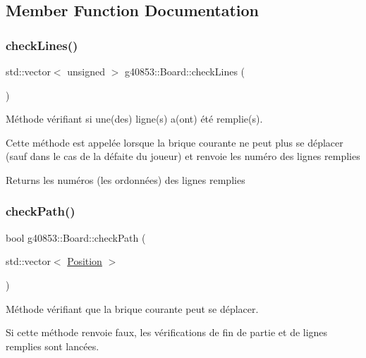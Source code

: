 \subsection{Member Function Documentation}
\hypertarget{classg40853_1_1_board_ae488e255dcf0fc9596870c60bf09a680}{}\label{classg40853_1_1_board_ae488e255dcf0fc9596870c60bf09a680} 
\subsubsection{\texorpdfstring{check\+Lines()}{checkLines()}}
{\footnotesize\ttfamily std\+::vector$<$ unsigned $>$ g40853\+::\+Board\+::check\+Lines (\begin{DoxyParamCaption}{ }\end{DoxyParamCaption})}



Méthode vérifiant si une(des) ligne(s) a(ont) été remplie(s). 

Cette méthode est appelée lorsque la brique courante ne peut plus se déplacer (sauf dans le cas de la défaite du joueur) et renvoie les numéro des lignes remplies

\begin{DoxyReturn}{Returns}
les numéros (les ordonnées) des lignes remplies 
\end{DoxyReturn}
\hypertarget{classg40853_1_1_board_a35e8081321fe2e5e50492efd4d6806db}{}\label{classg40853_1_1_board_a35e8081321fe2e5e50492efd4d6806db} 
\subsubsection{\texorpdfstring{check\+Path()}{checkPath()}}
{\footnotesize\ttfamily bool g40853\+::\+Board\+::check\+Path (\begin{DoxyParamCaption}\item[{std\+::vector$<$ \hyperlink{classg40853_1_1_position}{Position} $>$}]{ }\end{DoxyParamCaption})}



Méthode vérifiant que la brique courante peut se déplacer. 

Si cette méthode renvoie faux, les vérifications de fin de partie et de lignes remplies sont lancées.

